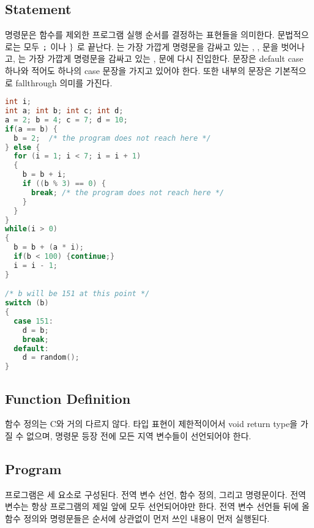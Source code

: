 \subsection {Statement}

 명령문은 함수를 제외한 프로그램 실행 순서를 결정하는 표현들을 의미한다.
문법적으로는 모두 $\mbox{\texttt{;}}$ 이나 $\tt{\}}$ 로 끝난다.
\CCbreak 는 가장 가깝게 명령문을 감싸고 있는 \CCswitch , \CCwhile , \CCfor 문을 벗어나고,
\CCcontinue 는 가장 가깝게 명령문을 감싸고 있는 \CCwhile, \CCfor 문에 다시 진입한다.
\CCswitch 문장은 default case 하나와 적어도 하나의 case 문장을 가지고 있어야 한다.
또한 \CCswitch 내부의 문장은 기본적으로 fallthrough 의미를 가진다.

\begin{lstlisting}[language=C, caption=Expression examples]
int i;
int a; int b; int c; int d;
a = 2; b = 4; c = 7; d = 10;
if(a == b) {
  b = 2;  /* the program does not reach here */
} else {
  for (i = 1; i < 7; i = i + 1)
  {
    b = b + i;
    if ((b % 3) == 0) { 
      break; /* the program does not reach here */ 
    }
  }
}
while(i > 0)
{
  b = b + (a * i);
  if(b < 100) {continue;}
  i = i - 1;
}

/* b will be 151 at this point */
switch (b)
{
  case 151:
    d = b;
    break;
  default:
    d = random();
}
\end{lstlisting}




\subsection {Function Definition}

 함수 정의는 C와 거의 다르지 않다. 
타입 표현이 제한적이어서 void return type을 가질 수 없으며, 명령문 등장 전에 모든 지역 변수들이 선언되어야 한다.




\subsection {Program}

\SubC 프로그램은 세 요소로 구성된다. 전역 변수 선언, 함수 정의, 그리고 명령문이다. 
전역 변수는 항상 프로그램의 제일 앞에 모두 선언되어야만 한다. 
전역 변수 선언들 뒤에 올 함수 정의와 명령문들은 순서에 상관없이 먼저 쓰인 내용이 먼저 실행된다.


